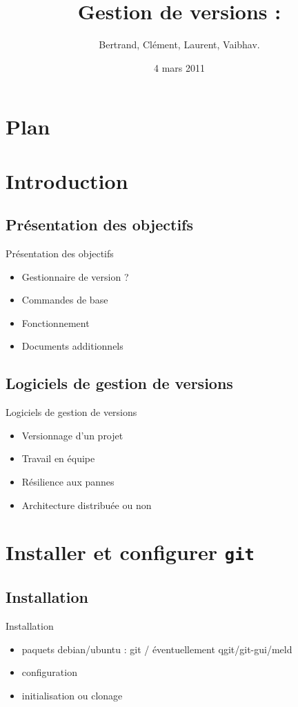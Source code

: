 \documentclass{beamer}
\title[ROSE]{Gestion de versions : \git}
\author{Bertrand, Clément, Laurent, Vaibhav.}
\institute{Télécom ParisTech}
\date{4 mars 2011}
\newcommand{\git}{\texttt{git}}
\begin{document}
\begin{frame}
  \titlepage
\end{frame}

\section*{Plan}

\section{Introduction}
\subsection*{Présentation des objectifs}
\begin{frame}{Présentation des objectifs}
  \begin{itemize}
  \item Gestionnaire de version ?
  \item Commandes de base
  \item Fonctionnement
  \item Documents additionnels
  \end{itemize}
\end{frame}

\subsection*{Logiciels de gestion de versions}
\begin{frame}{Logiciels de gestion de versions}
  \begin{itemize}
  \item Versionnage d'un projet
  \item Travail en équipe
  \item Résilience aux pannes
  \item Architecture distribuée ou non 
  \end{itemize}
\end{frame}

\section{Installer et configurer \git}

\subsection*{Installation}
\begin{frame}{Installation}
  \begin{itemize}
  \item paquets debian/ubuntu : git / éventuellement qgit/git-gui/meld 
  \item configuration 
  \item initialisation ou clonage
  \end{itemize}
\end{frame}
\end{document}
